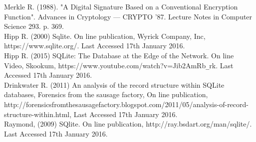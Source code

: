 \begin{thebibliography}{0}
Merkle R. (1988). "A Digital Signature Based on a Conventional Encryption Function". Advances in Cryptology — CRYPTO '87. Lecture Notes in Computer Science 293. p. 369.
\\
Hipp R. (2000) Sqlite. On line publication, Wyrick Company, Inc, https://www.sqlite.org/. Last Accessed 17th January 2016.
\\
Hipp R. (2015) SQLite: The Database at the Edge of the Network. On line Video, Skookum, https://www.youtube.com/watch?v=Jib2AmRb\verb|_|rk. Last Accessed 17th January 2016.
\\
Drinkwater R. (2011) An analysis of the record structure within SQLite databases, Forensics from the sausage factory, On line publication, http://forensicsfromthesausagefactory.blogspot.com/2011/05/analysis-of-record- \newline structure-within.html, Last Accessed 17th January 2016.
\\
Raymond, (2009) SQlite.  On line publication, http://ray.bsdart.org/man/sqlite/. Last Accessed 17th January 2016.

\end{thebibliography}